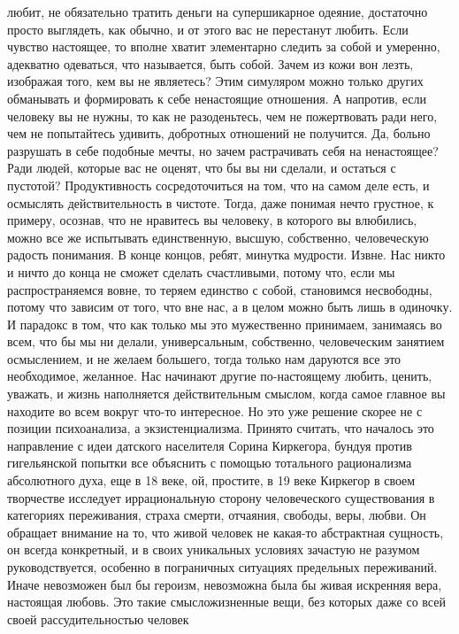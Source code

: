 любит, не обязательно тратить деньги на супершикарное одеяние, достаточно просто
выглядеть, как обычно, и от этого вас не перестанут любить. Если чувство
настоящее, то вполне хватит элементарно следить за собой и умеренно, адекватно
одеваться, что называется, быть собой. Зачем из кожи вон лезть, изображая того,
кем вы не являетесь? Этим симуляром можно только других обманывать и формировать
к себе ненастоящие отношения. А напротив, если человеку вы не нужны, то как не
разоденьтесь, чем не пожертвовать ради него, чем не попытайтесь удивить,
добротных отношений не получится. Да, больно разрушать в себе подобные мечты, но
зачем растрачивать себя на ненастоящее? Ради людей, которые вас не оценят, что
бы вы ни сделали, и остаться с пустотой? Продуктивность сосредоточиться на том,
что на самом деле есть, и осмыслять действительность в чистоте. Тогда, даже
понимая нечто грустное, к примеру, осознав, что не нравитесь вы человеку, в
которого вы влюбились, можно все же испытывать единственную, высшую, собственно,
человеческую радость понимания. В конце концов, ребят, минутка мудрости. Извне.
Нас никто и ничто до конца не сможет сделать счастливыми, потому что, если мы
распространяемся вовне, то теряем единство с собой, становимся несвободны,
потому что зависим от того, что вне нас, а в целом можно быть лишь в одиночку. И
парадокс в том, что как только мы это мужественно принимаем, занимаясь во всем,
что бы мы ни делали, универсальным, собственно, человеческим занятием
осмыслением, и не желаем большего, тогда только нам даруются все это
необходимое, желанное. Нас начинают другие по-настоящему любить, ценить,
уважать, и жизнь наполняется действительным смыслом, когда самое главное вы
находите во всем вокруг что-то интересное. Но это уже решение скорее не с
позиции психоанализа, а экзистенциализма. Принято считать, что началось это
направление с идеи датского населителя Сорина Киркегора, бундуя против
гигельянской попытки все объяснить с помощью тотального рационализма абсолютного
духа, еще в 18 веке, ой, простите, в 19 веке Киркегор в своем творчестве
исследует иррациональную сторону человеческого существования в категориях
переживания, страха смерти, отчаяния, свободы, веры, любви. Он обращает внимание
на то, что живой человек не какая-то абстрактная сущность, он всегда конкретный,
и в своих уникальных условиях зачастую не разумом руководствуется, особенно в
пограничных ситуациях предельных переживаний. Иначе невозможен был бы героизм,
невозможна была бы живая искренняя вера, настоящая любовь. Это такие
смысложизненные вещи, без которых даже со всей своей рассудительностью человек
